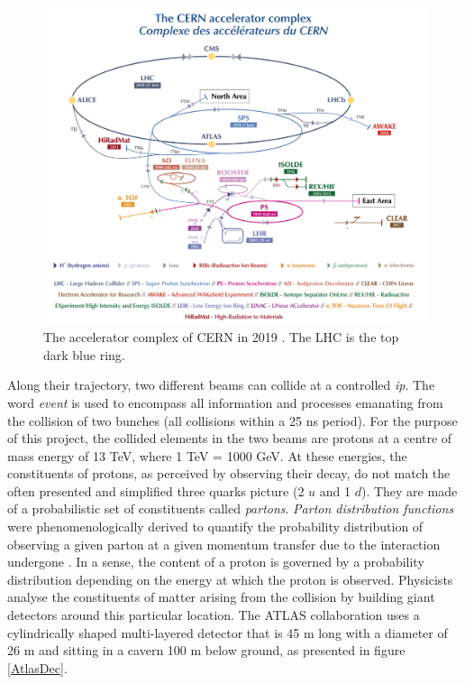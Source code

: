 \begin{figure}[!h]
\centering
\hspace*{-0.5in}
\includegraphics[scale = 0.4]{Images/ATLAS/cernAcc}
\caption[Accelerator complex of CERN in 2019]{The accelerator complex of CERN in 2019 \cite{Mobs:2684277}. The LHC is the top dark blue ring.}
\label{CernAccSys}
\end{figure}
\newpage
Along their trajectory, two different beams can collide at a controlled \textit{\gls{ip}}. The word \textit{event} is used to encompass all information and processes emanating from the collision of two bunches (all collisions within a 25 ns period). For the purpose of this project, the collided elements in the two beams are protons at a centre of mass energy of 13 TeV, where 1 TeV = 1000 GeV. At these energies, the constituents of protons, as perceived by observing their decay, do not match the often presented and simplified three quarks picture (2 $u$ and 1 $d$). They are made of a probabilistic set of constituents called \textit{partons}. \textit{Parton distribution functions} were phenomenologically derived to quantify the probability distribution of observing a given parton at a given momentum transfer due to the interaction undergone \cite{pdfLHC}. In a sense, the content of a proton is governed by a probability distribution depending on the energy at which the proton is observed. Physicists analyse the constituents of matter arising from the collision by building giant detectors around this particular location. The ATLAS collaboration uses a cylindrically shaped multi-layered detector that is 45 m long with a diameter of 26 m and sitting in a cavern 100 m below ground, as presented in figure \ref{AtlasDec}.

